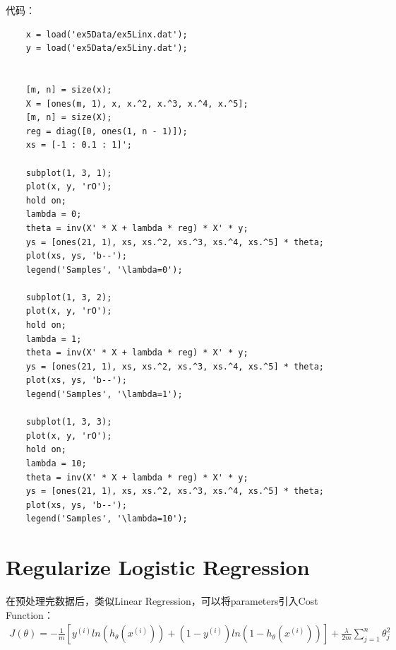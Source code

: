 \documentclass{article}
\begin{document}
代码：
\begin{lstlisting}
    x = load('ex5Data/ex5Linx.dat');
    y = load('ex5Data/ex5Liny.dat');


    [m, n] = size(x);
    X = [ones(m, 1), x, x.^2, x.^3, x.^4, x.^5];
    [m, n] = size(X);
    reg = diag([0, ones(1, n - 1)]);
    xs = [-1 : 0.1 : 1]';

    subplot(1, 3, 1);
    plot(x, y, 'rO');
    hold on;
    lambda = 0;
    theta = inv(X' * X + lambda * reg) * X' * y;
    ys = [ones(21, 1), xs, xs.^2, xs.^3, xs.^4, xs.^5] * theta;
    plot(xs, ys, 'b--');
    legend('Samples', '\lambda=0');

    subplot(1, 3, 2);
    plot(x, y, 'rO');
    hold on;
    lambda = 1;
    theta = inv(X' * X + lambda * reg) * X' * y;
    ys = [ones(21, 1), xs, xs.^2, xs.^3, xs.^4, xs.^5] * theta;
    plot(xs, ys, 'b--');
    legend('Samples', '\lambda=1');

    subplot(1, 3, 3);
    plot(x, y, 'rO');
    hold on;
    lambda = 10;
    theta = inv(X' * X + lambda * reg) * X' * y;
    ys = [ones(21, 1), xs, xs.^2, xs.^3, xs.^4, xs.^5] * theta;
    plot(xs, ys, 'b--');
    legend('Samples', '\lambda=10');

\end{lstlisting}

\section{Regularize Logistic Regression}

在预处理完数据后，类似Linear Regression，可以将parameters引入Cost Function：
\begin{equation}
    \begin{split}
        J(\theta)=-\frac{1}{m}[y^{(i)}ln(h_\theta(x^{(i)}))+(1-y^{(i)})ln(1-h_\theta(x^{(i)}))]+\frac{\lambda}{2m}\sum_{j=1}^n\theta_j^2
    \end{split}
\end{equation}
\end{document}
